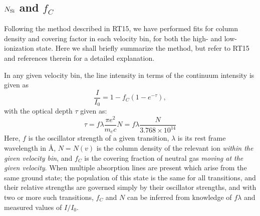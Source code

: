 \documentclass[twocolumn]{aastex61}
\begin{document}


\subsection{$N_{\rm Si}$ and $f_C$}\label{sec:aod}

Following the method described in RT15, we have performed fits for
column density and covering factor in each velocity bin, for both the
high- and low-ionization state. Here we shall briefly summarize the
method, but refer to RT15 and references therein for a detailed
explanation.

In any given velocity bin, the line intensity in terms of the continuum
intensity is given as
%
\begin{equation}
\label{eq:II0}
\frac{I}{I_0} = 1 - f_C (1 - e^{-\tau}),
\end{equation}
%
 with the optical depth $\tau$ given as:
%
\begin{equation}
\label{eq:tau}
\tau = f\lambda \frac{\pi e^2}{m_e c} N 
       = f\lambda \frac{N}{3.768 \times 10^{14}}
\end{equation}
%
 Here, $f$ is the oscillator strength of a given transition, $\lambda$
is its rest frame wavelength in Å, $N = N(v)$ is the column density of
the relevant ion \emph{within the given velocity bin}, and $f_{C}$ is
the covering fraction of neutral gas \emph{moving at the given
velocity}. When multiple absorption lines are present which arise from
the same ground state; the population of this state is the same for all
transitions, and their relative strengths are governed simply by their
oscillator strengths, and with two or more such transitions, $f_{C}$ and
$N$ can be inferred from knowledge of $f \lambda$ and measured values of
$I/I_0$.
\end{document}
